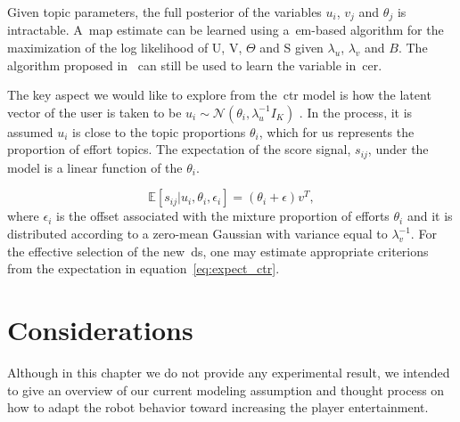 Given topic parameters, the full posterior of the variables $u_{i}$, $v_{j}$ and $\theta_{j}$ is intractable. A~\gls{map} estimate can be learned using a~\gls{em}-based algorithm for the maximization of the log likelihood of U, V, $\Theta$ and S given $\lambda_{u}$, $\lambda_{v}$ and $B$. The algorithm proposed in~\cite{wang_collaborative_2011} can still be used to learn the variable in~\gls{cer}. 

The key aspect we would like to explore from the~\gls{ctr} model is how the latent vector of the user is taken to be $u_{i} \sim \mathcal{N}(\theta_{i}, \lambda_{u}^{-1}I_{K})$ %
. In the process, it is assumed $u_{i}$ is close to the topic proportions $\theta_{i}$, which for us represents the proportion of effort topics. The expectation of the score signal, $s_{ij}$, under the model is a linear function of the $\theta_{i}$.

\begin{equation}
    \mathbb{E}[s_{ij}|u_{i}, \theta_{i}, \epsilon_{i}] = (\theta_{i} + \epsilon)v^{T},
    \label{eq:expect_ctr}
\end{equation}
where $\epsilon_{i}$ is the offset associated with the mixture proportion of efforts $\theta_{i}$ and it is distributed according to a zero-mean Gaussian with variance equal to $\lambda_{v}^{-1}$. For the effective selection of the new~\gls{ds}, one may estimate appropriate criterions from the expectation in equation~\ref{eq:expect_ctr}.


\section{Considerations}
Although in this chapter we do not provide any experimental result, we intended to give an overview of our current modeling assumption and thought process on how to adapt the robot behavior toward increasing the player entertainment.

